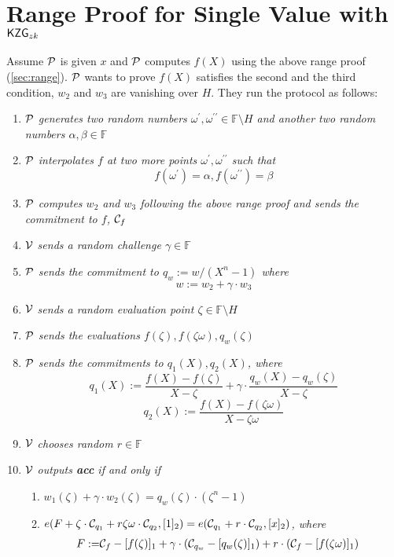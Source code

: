 \section{Range Proof for Single Value with $\mathsf{KZG}_{zk}$}
\label{sec:rpzk}
Assume $\mathcal{P}$ is given $x$ and $\mathcal{P}$ computes $f(X)$ using the above range proof (\ref{sec:range}). $\mathcal{P}$ wants to prove $f(X)$ satisfies the second and the third condition, \ie $w_2$ and $w_3$ are vanishing over $H$. They run the protocol as follows:
\begin{enumerate}
    \item $\mathcal{P}$ \textit{generates two random numbers $\omega^{\prime},\omega^{\prime\prime}\in\mathbb{F}\setminus{H}$ and another two random numbers $\alpha,\beta\in\mathbb{F}$}
    \item $\mathcal{P}$ \textit{interpolates $f$ at two more points ${\omega^{\prime},\omega^{\prime\prime}}$ such that}
    \[ f(\omega^{\prime})=\alpha,f(\omega^{\prime\prime})=\beta \]
    \item $\mathcal{P}$ \textit{computes $w_2$ and $w_3$ following the above range proof and sends the commitment to $f$,} $\mathcal{C}_f$
    \item $\mathcal{V}$ \textit{sends a random challenge $\gamma\in\mathbb{F}$}
    \item $\mathcal{P}$ \textit{sends the commitment to $q_w:=w/(X^n-1)$ where}
    \[ w:=w_2+\gamma\cdot{w_3} \]
    \item $\mathcal{V}$ \textit{sends a random evaluation point $\zeta\in\mathbb{F}\setminus{H}$}
    \item $\mathcal{P}$ \textit{sends the evaluations $f(\zeta),f(\zeta\omega),q_w(\zeta)$}
    \item $\mathcal{P}$ \textit{sends the commitments to $q_1(X),q_2(X)$, where}
    \[ q_1(X):=\frac{f(X)-f(\zeta)}{X-\zeta}+\gamma\cdot\frac{q_w(X)-q_w(\zeta)}{X-\zeta} \]
    \[ q_2(X):=\frac{f(X)-f(\zeta\omega)}{X-\zeta\omega} \]
    \item $\mathcal{V}$ \textit{chooses random $r\in\mathbb{F}$}
    \item $\mathcal{V}$ \textit{outputs \textbf{acc} if and only if}
    \begin{enumerate}
    	\item $w_1(\zeta)+\gamma\cdot{w_2(\zeta)}=q_w(\zeta)\cdot(\zeta^n-1)$
    	\item $e(F+\zeta\cdot\mathcal{C}_{q_1}+r\zeta\omega\cdot\mathcal{C}_{q_2},[1]_2)=e(\mathcal{C}_{q_1}+r\cdot\mathcal{C}_{q_2},[x]_2)$\textit{, where}
    	\begin{align*}
    		F:=&\mathcal{C}_f-[f(\zeta)]_1+\gamma\cdot(\mathcal{C}_{q_w}-[q_w(\zeta)]_1)+r\cdot(\mathcal{C}_f-[f(\zeta\omega)]_1)
    	\end{align*}
    \end{enumerate}
\end{enumerate}

